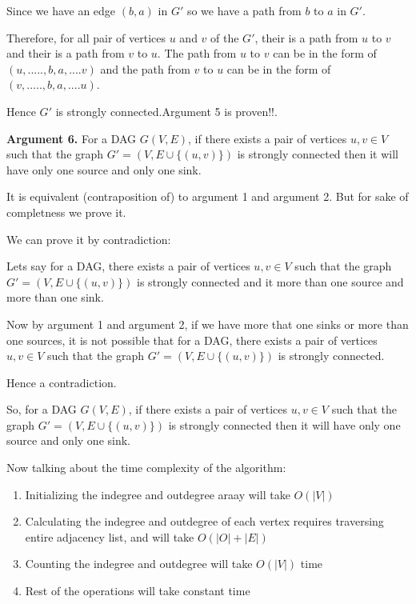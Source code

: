 \documentclass[answers]{exam}
\begin{document}
\begin{questions}
\begin{parts}
\begin{solution}
Since we have an edge $(b,a)$ in $G'$ so we have a path from $b$ to $a$ in $G'$.\par

Therefore, for all pair of vertices $u$ and $v$ of the $G'$, their is a path from $u$ to $v$ and their is a path from $v$ to $u$. The path from $u$ to $v$ can be in the form of $(u,.....,b,a,....v)$ and the path from $v$ to $u$ can be in the form of $(v,.....,b,a,....u)$.\par

Hence $G'$ is strongly connected.Argument 5 is proven!!.



\textbf{Argument 6.} For a DAG $G(V,E)$, if there exists a pair of vertices $u, v \in V$ such that the graph $G' = (V, E \cup \{(u, v)\})$ is strongly connected then it will have only one source and only one sink.

It is equivalent (contraposition of) to argument 1 and argument 2. But for sake of completness we prove it.\par

We can prove it by contradiction:

Lets say for a DAG, there exists a pair of vertices $u, v \in V$ such that the graph $G' = (V, E \cup \{(u, v)\})$ is strongly connected and it  more than one source and more than one sink.

Now by argument 1 and argument 2, if we have more that one sinks or more than one sources, it is not possible that for a DAG, there exists a pair of vertices $u, v \in V$ such that the graph $G' = (V, E \cup \{(u, v)\})$ is strongly connected.\par 
Hence a contradiction. \par
So, for a DAG $G(V,E)$, if there exists a pair of vertices $u, v \in V$ such that the graph $G' = (V, E \cup \{(u, v)\})$ is strongly connected then it will have only one source and only one sink.

Now talking about the time complexity of the algorithm:
\begin{enumerate}
    \item Initializing the indegree and outdegree araay will take $O(|V|)$
    \item Calculating the indegree and outdegree of each vertex requires traversing entire adjacency list, and will take $O(|O|+|E|)$ 
    \item Counting the indegree and outdegree will take $O(|V|)$ time
    \item Rest of the operations will take constant time
\end{enumerate}


\end{solution}
\end{parts}
\end{questions}
\end{document}
